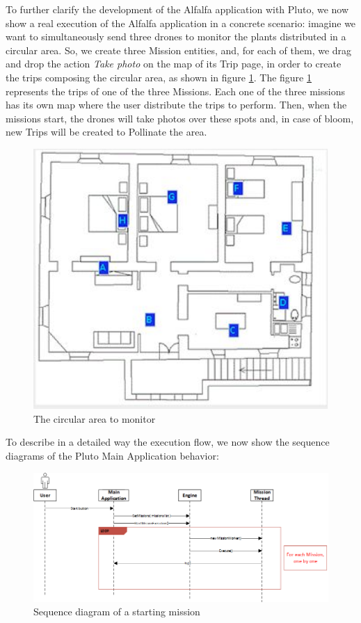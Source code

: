 To further clarify the development of the Alfalfa\cite{alfalfa} application with Pluto, we now show a real execution of the Alfalfa application in a concrete scenario:
imagine we want to simultaneously send three drones to monitor the plants distributed in a circular area.
So, we create three Mission entities, and, for each of them, we drag and drop the action \textit{Take photo} on the map of its Trip page, in order to create the trips composing the circular area, as shown in figure \ref{fig:alfalfaArea}.
The figure \ref{fig:alfalfaArea} represents the trips of one of the three Missions.
Each one of the three missions has its own map where the user distribute the trips to perform.
Then, when the missions start, the drones will take photos over these spots and, in case of bloom, new Trips will be created to Pollinate the area.

\begin{figure}[H]
  \centering
  \includegraphics[width=\linewidth]{pictures/alfalfaArea.png}
  \caption{The circular area to monitor}
  \label{fig:alfalfaArea}
\end{figure}


To describe in a detailed way the execution flow, we now show the sequence diagrams of the Pluto Main Application behavior:
\\

\begin{figure}[H]
  \centering
  \includegraphics[width=\linewidth]{pictures/Alfalfa_Sequence_MissionStart.png}
  \caption{Sequence diagram of a starting mission}
  \label{fig:alfalfaSequence1}
\end{figure}

